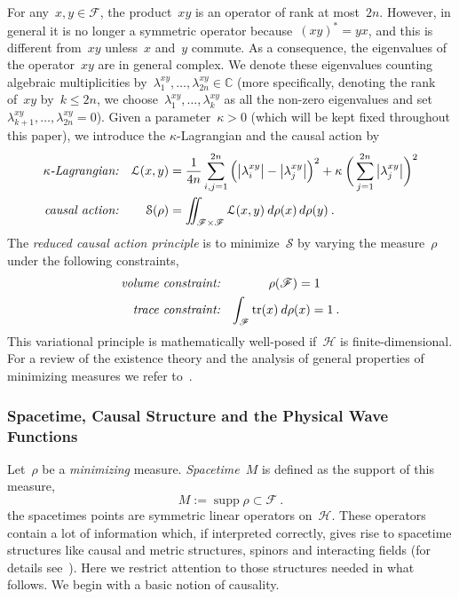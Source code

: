 \documentclass[reqno,11pt]{amsart}
\numberwithin{equation}{section}
\newcommand{\C}{\mathbb{C}}
\newcommand{\1}{\mathds{1}}
\DeclareMathOperator{\tr}{tr}
\renewcommand{\L}{{\mathcal{L}}}
\newcommand{\Sact}{{\mathcal{S}}}
\renewcommand{\H}{\mathscr{H}}
\newcommand{\F}{{\mathscr{F}}}
\DeclareMathOperator{\supp}{supp}
\begin{document}
For any~$x, y \in \F$, the product~$x y$ is an operator of rank at most~$2n$. 
However, in general it is no longer a symmetric operator because~$(xy)^* = yx$,
and this is different from~$xy$ unless~$x$ and~$y$ commute.
As a consequence, the eigenvalues of the operator~$xy$ are in general complex.
We denote these eigenvalues counting algebraic multiplicities
by~$\lambda^{xy}_1, \ldots, \lambda^{xy}_{2n} \in \C$
(more specifically,
denoting the rank of~$xy$ by~$k \leq 2n$, we choose~$\lambda^{xy}_1, \ldots, \lambda^{xy}_{k}$ as all
the non-zero eigenvalues and set~$\lambda^{xy}_{k+1}, \ldots, \lambda^{xy}_{2n}=0$).
Given a parameter~$\kappa>0$ (which will be kept fixed throughout this paper),
we introduce the $\kappa$-Lagrangian and the causal action by
\begin{align*}
\text{\em{$\kappa$-Lagrangian:}} && \L(x,y) &= 
\frac{1}{4n} \sum_{i,j=1}^{2n} \Big( \big|\lambda^{xy}_i \big|
- \big|\lambda^{xy}_j \big| \Big)^2 + \kappa\: \bigg( \sum_{j=1}^{2n} \big|\lambda^{xy}_j \big| \bigg)^2 \\%
\text{\em{causal action:}} && \Sact(\rho) &= \iint_{\F \times \F} \L(x,y)\: d\rho(x)\, d\rho(y) \:. %
\end{align*}
The {\em{reduced causal action principle}} is to minimize~$\Sact$ by varying the measure~$\rho$
under the following constraints,
\begin{align*}
\text{\em{volume constraint:}} && \rho(\F) = 1 \quad\;\; \\%
\text{\em{trace constraint:}} && \int_\F \tr(x)\: d\rho(x) = 1 \:. %
\end{align*}
This variational principle is mathematically well-posed if~$\H$ is finite-dimensional.
For a review of the existence theory and the analysis of general properties of minimizing measures
we refer to~\cite[Chapter~12]{intro}.

\subsubsection{Spacetime, Causal Structure and the Physical Wave Functions} \label{secweo}
Let~$\rho$ be a {\em{minimizing}} measure. {\em{Spacetime}}~$M$ is defined as the support
of this measure,
\[ %
M := \supp \rho \subset \F \:. \]
the spacetimes points are symmetric linear operators on~$\H$.
These operators contain a lot of information which, if interpreted correctly,
gives rise to spacetime structures like causal and metric structures, spinors
and interacting fields (for details see~\cite[Chapter~1]{cfs}).
Here we restrict attention to those structures needed in what follows.
We begin with a basic notion of causality.
\end{document}
